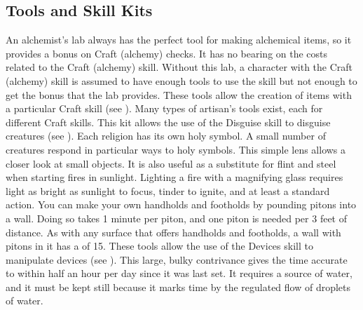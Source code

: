     \subsection{Tools and Skill Kits}
         An alchemist's lab always has the perfect tool for making alchemical items, so it provides a  bonus on Craft (alchemy) checks. It has no bearing on the costs related to the Craft (alchemy) skill. Without this lab, a character with the Craft (alchemy) skill is assumed to have enough tools to use the skill but not enough to get the  bonus that the lab provides.
         These tools allow the creation of items with a particular Craft skill (see ).
        Many types of artisan's tools exist, each for different Craft skills.
         This kit allows the use of the Disguise skill to disguise creatures (see ).
         Each religion has its own holy symbol. A small number of creatures respond in particular ways to holy symbols.
         This simple lens allows a closer look at small objects. It is also useful as a substitute for flint and steel when starting fires in sunlight. Lighting a fire with a magnifying glass requires light as bright as sunlight to focus, tinder to ignite, and at least a standard action.
         You can make your own handholds and footholds by pounding pitons into a wall. Doing so takes 1 minute per piton, and one piton is needed per 3 feet of distance. As with any surface that offers handholds and footholds, a wall with pitons in it has a  of 15.
         These tools allow the use of the Devices skill to manipulate devices (see ).
         This large, bulky contrivance gives the time accurate to within half an hour per day since it was last set. It requires a source of water, and it must be kept still because it marks time by the regulated flow of droplets of water.

